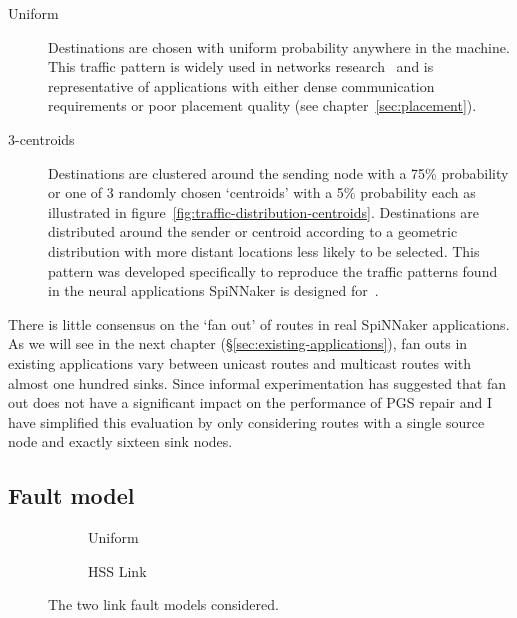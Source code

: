 			\begin{description}
				
				\item[Uniform] Destinations are chosen with uniform probability
				anywhere in the machine. This traffic pattern is widely used in
				networks research~\cite[chapter~23]{dally04} and is representative of
				applications with either dense communication requirements or poor
				placement quality (see chapter~\ref{sec:placement}).
				
				\item[3-centroids] Destinations are clustered around the sending node
				with a 75\% probability or one of 3 randomly chosen `centroids' with a
				5\% probability each as illustrated in
				figure~\ref{fig:traffic-distribution-centroids}.  Destinations are
				distributed around the sender or centroid according to a geometric
				distribution with more distant locations less likely to be selected.
				This pattern was developed specifically to reproduce the traffic
				patterns found in the neural applications SpiNNaker is designed
				for~\cite{navaridas14}.
				
			\end{description}
			
			There is little consensus on the `fan out' of routes in real SpiNNaker
			applications. As we will see in the next chapter
			(\S\ref{sec:existing-applications}), fan outs in existing applications
			vary between unicast routes and multicast routes with almost one hundred
			sinks. Since informal experimentation has suggested that fan out does not
			have a significant impact on the performance of PGS repair and I have
			simplified this evaluation by only considering routes with a single
			source node and exactly sixteen sink nodes.
		
		\subsection{Fault model}
			
			\begin{figure}
				\center
				\begin{subfigure}{0.48\linewidth}
					\hspace*{-0.5cm}
					
					\caption{Uniform}
					\label{fig:fault-example-uniform}
				\end{subfigure}
				\begin{subfigure}{0.48\linewidth}
					\hspace*{-0.5cm}
					
					\caption{HSS Link}
					\label{fig:fault-example-hss}
				\end{subfigure}
				
				\caption{The two link fault models considered.}
				\label{fig:fault-example}
			\end{figure}
			
